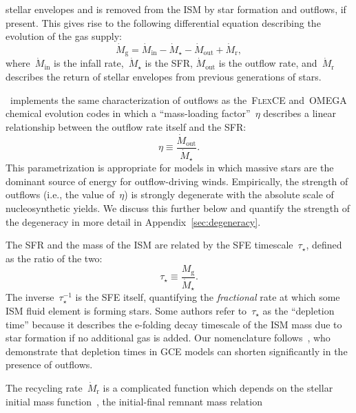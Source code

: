 \documentclass[ms.tex]{subfiles}
\begin{document}
stellar envelopes and is removed from the ISM by star formation and outflows,
if present.
This gives rise to the following differential equation describing the evolution
of the gas supply:
\begin{equation}
\dot{M}_\text{g} = \dot{M}_\text{in} - \dot{M}_\star - \dot{M}_\text{out}
+ \dot{M}_\text{r},
\label{eq:mdotgas}
\end{equation}
where~$\dot{M}_\text{in}$ is the infall rate,~$\dot{M}_\star$ is the SFR,
$\dot{M}_\text{out}$ is the outflow rate, and~$\dot{M}_\text{r}$ describes
the return of stellar envelopes from previous generations of stars.
\par
\vice~implements the same characterization of outflows as the~\textsc{FlexCE}
\citep{Andrews2017} and~\textsc{OMEGA}~\citep{Cote2017} chemical evolution
codes in which a ``mass-loading factor''~$\eta$ describes a linear relationship
between the outflow rate itself and the SFR:
\begin{equation}
\eta \equiv \frac{\dot{M}_\text{out}}{\dot{M}_\star}.
\label{eq:massloading}
\end{equation}
This parametrization is appropriate for models in which massive stars are the
dominant source of energy for outflow-driving winds.
Empirically, the strength of outflows (i.e., the value of~$\eta$) is strongly
degenerate with the absolute scale of nucleosynthetic yields.
We discuss this further below and quantify the strength of the degeneracy in
more detail in Appendix~\ref{sec:degeneracy}.
\par
The SFR and the mass of the ISM are related by the SFE timescale~$\tau_\star$,
defined as the ratio of the two:
\begin{equation}
\tau_\star \equiv \frac{M_\text{g}}{\dot{M}_\star}.
\label{eq:taustar}
\end{equation}
The inverse~$\tau_\star^{-1}$ is the SFE itself, quantifying the
\textit{fractional} rate at which some ISM fluid element is forming stars.
Some authors refer to~$\tau_\star$ as the ``depletion time''
\citep[e.g.,][]{Tacconi2018} because it describes the e-folding decay timescale
of the ISM mass due to star formation if no additional gas is added.
Our nomenclature follows~\citet{Weinberg2017}, who demonstrate that depletion
times in GCE models can shorten significantly in the presence of outflows.
\par
The recycling rate~$\dot{M}_\text{r}$ is a complicated function which depends
on the stellar initial mass function~\citep[IMF; e.g.,][]{Salpeter1955,
Miller1979, Kroupa2001, Chabrier2003}, the initial-final remnant mass relation
\end{document}
